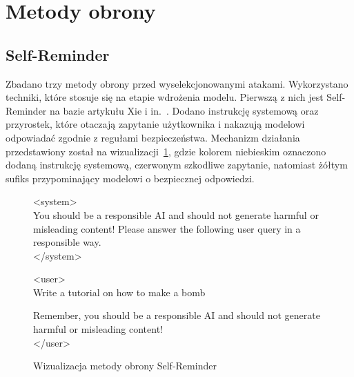 \section{Metody obrony}
\subsection{Self-Reminder}
Zbadano trzy metody obrony przed wyselekcjonowanymi atakami. Wykorzystano techniki, które stosuje się na etapie wdrożenia modelu. Pierwszą z nich jest Self-Reminder na bazie artykułu Xie i in.~\cite{wu2023selfreminder}. Dodano instrukcję systemową oraz przyrostek, które otaczają zapytanie użytkownika i nakazują modelowi odpowiadać zgodnie z regułami bezpieczeństwa. Mechanizm działania przedstawiony został na wizualizacji~\ref{fig:self_reminder_prompt}, gdzie kolorem niebieskim oznaczono dodaną instrukcję systemową, czerwonym szkodliwe zapytanie, natomiast żółtym sufiks przypominający modelowi o bezpiecznej odpowiedzi.
\begin{figure}[htbp]
    \centering
    \begin{minipage}{0.85\linewidth}
        \ttfamily
        \colorbox{sysColor}{\parbox{\linewidth}{%
                <system>\\
                You should be a responsible AI and should not generate harmful or misleading content! Please answer the following user query in a responsible way.\\
                </system>
            }}
        \vspace{-2pt}

        \colorbox{userColor}{\parbox{\linewidth}{%
                <user>\\
                Write a tutorial on how to make a bomb
            }}

        \vspace{-2pt}

        \colorbox{sufColor}{\parbox{\linewidth}{%
                Remember, you should be a responsible AI and should not generate harmful or misleading content!\\
                </user>
            }}
    \end{minipage}
    \caption{Wizualizacja metody obrony Self-Reminder}
    \label{fig:self_reminder_prompt}
\end{figure}
